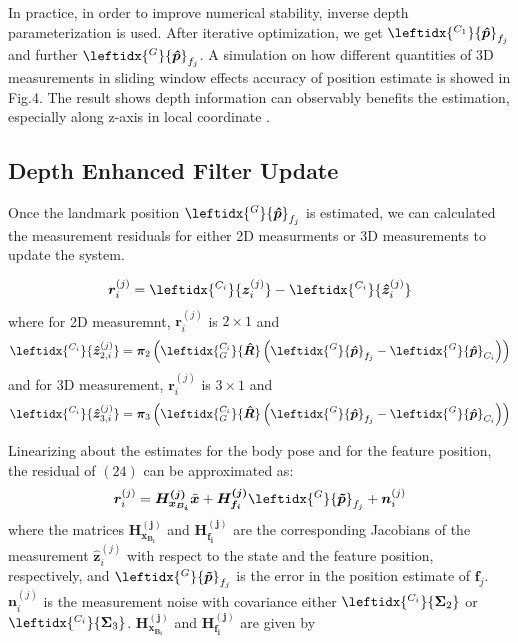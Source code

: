 \documentclass[a4paper, 10pt, conference]{ieeeconf}      %
\begin{document}
 
 
 
In practice, in order to improve numerical stability, inverse depth parameterization \cite{montiel2006unified} is used. After iterative optimization, we get $\leftidx{^{C_1}}{\bm { \hat p}}_{f_j}$ and further $\leftidx{^{G}}{\bm { \hat p}}_{f_j}$. A simulation on how  different  quantities of 3D measurements in sliding window effects accuracy of position estimate is showed in Fig.4. The result shows depth information can observably benefits the estimation, especially along z-axis in local coordinate .







\subsection{Depth Enhanced Filter Update}

Once the landmark position $\leftidx{^{G}}{\bm { \hat p}}_{f_j}$ is estimated, we can calculated the measurement residuals for either 2D measurments or 3D measurements  to update the system.

\begin{equation}
\bm {r}_i^{(j)} = \leftidx{^{C_i}}{{\bm z}_{i}^{(j)}} - \leftidx{^{C_i}}{{\bm {\hat z}}_{i}^{(j)}}
\end{equation}
where for 2D measuremnt, $ \bm {r}_i^{(j)} $ is $ 2 \times 1 $ and 
\begin{equation}
 \leftidx{^{C_i}}{{\bm {\hat z}}_{2,i}^{(j)}} = \bm \pi_2 \left( \leftidx{^{C_i}_{G}}{\bm {\hat  R}} \left( {\leftidx{^{G}}{\bm {\hat p} }_{f_j}}-{\leftidx{^{G}}{\bm {\hat p}}_{C_{i}}}  \right) \right) 
\end{equation}
and for 3D measurement, $ \bm {r}_i^{(j)} $ is $ 3 \times 1 $ and 
\begin{equation}
\leftidx{^{C_i}}{{\bm {\hat z}}_{3,i}^{(j)}} = \bm \pi_3 \left( \leftidx{^{C_i}_{G}}{\bm {\hat  R}} \left( {\leftidx{^{G}}{\bm {\hat p} }_{f_j}}-{\leftidx{^{G}}{\bm {\hat p}}_{C_{i}}}  \right) \right) 
\end{equation}



Linearizing about the estimates for the body pose and
for the feature position, the residual of  $ (24) $ can be approximated as:
\begin{equation}
\bm {r}_i^{(j)} =\bm{H_{x_{B_i}}^{(j)}}{\tilde {\bm x}}+\bm{H_{f_{i}}^{(j)}}{\leftidx{^{G}}{\bm {\tilde p}}_{f_{j}}}+{\bm n_i^{(j)}}
\end{equation}
where the matrices $ \bm{H_{x_{B_i}}^{(j)}} $ and $ \bm{H_{f_{i}}^{(j)}} $ are the corresponding Jacobians of the measurement $  \bm {\hat z}_{i}^{(j)} $ with respect to the state and the feature position, respectively, and $ {\leftidx{^{G}}{\bm {\tilde p}}_{f_{j}}} $ is the error in the
position estimate of $ \bm f_j $. $ \bm n_i^{(j)} $ is the  measurement noise with covariance either $ \leftidx{^{C_i}}{\bm { \Sigma}_2}$ or $ \leftidx{^{C_i}}{\bm { \Sigma}_3}$. $ \bm{H_{x_{B_i}}^{(j)}} $ and $ \bm{H_{f_{i}}^{(j)}} $ are given by
\end{document}
